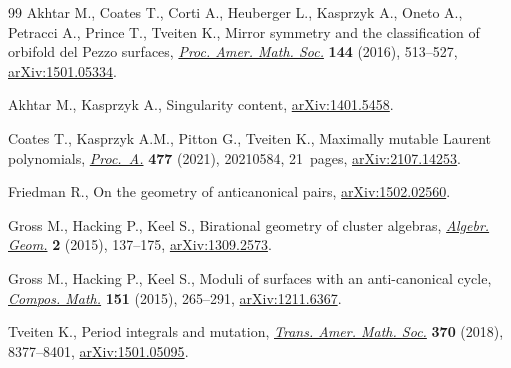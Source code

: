 \documentclass[11pt]{article}
\numberwithin{equation}{section}
\begin{document}
\begin{thebibliography}{99}
Akhtar M., Coates T., Corti A., Heuberger L., Kasprzyk A., Oneto A., Petracci
 A., Prince T., Tveiten K., Mirror symmetry and the classification of orbifold
 del {P}ezzo surfaces, \href{https://doi.org/10.1090/proc/12876}{\textit{Proc. Amer. Math. Soc.}} \textbf{144} (2016),
 513--527, \href{https://arxiv.org/abs/1501.05334}{arXiv:1501.05334}.

Akhtar M., Kasprzyk A., Singularity content, \href{https://arxiv.org/abs/1401.5458}{arXiv:1401.5458}.

Coates T., Kasprzyk A.M., Pitton G., Tveiten K., Maximally mutable {L}aurent
 polynomials, \href{https://doi.org/10.1098/rspa.2021.0584}{\textit{Proc.~A.}} \textbf{477} (2021), 20210584, 21~pages,
 \href{https://arxiv.org/abs/2107.14253}{arXiv:2107.14253}.

Friedman R., On the geometry of anticanonical pairs, \href{https://arxiv.org/abs/1502.02560}{arXiv:1502.02560}.

Gross M., Hacking P., Keel S., Birational geometry of cluster algebras,
 \href{https://doi.org/10.14231/AG-2015-007}{\textit{Algebr. Geom.}} \textbf{2} (2015), 137--175, \href{https://arxiv.org/abs/1309.2573}{arXiv:1309.2573}.

Gross M., Hacking P., Keel S., Moduli of surfaces with an anti-canonical cycle,
 \href{https://doi.org/10.1112/S0010437X14007611}{\textit{Compos. Math.}} \textbf{151} (2015), 265--291, \href{https://arxiv.org/abs/1211.6367}{arXiv:1211.6367}.

Tveiten K., Period integrals and mutation, \href{https://doi.org/10.1090/tran/7320}{\textit{Trans. Amer. Math. Soc.}}
 \textbf{370} (2018), 8377--8401, \href{https://arxiv.org/abs/1501.05095}{arXiv:1501.05095}.

\end{thebibliography}
\end{document}
